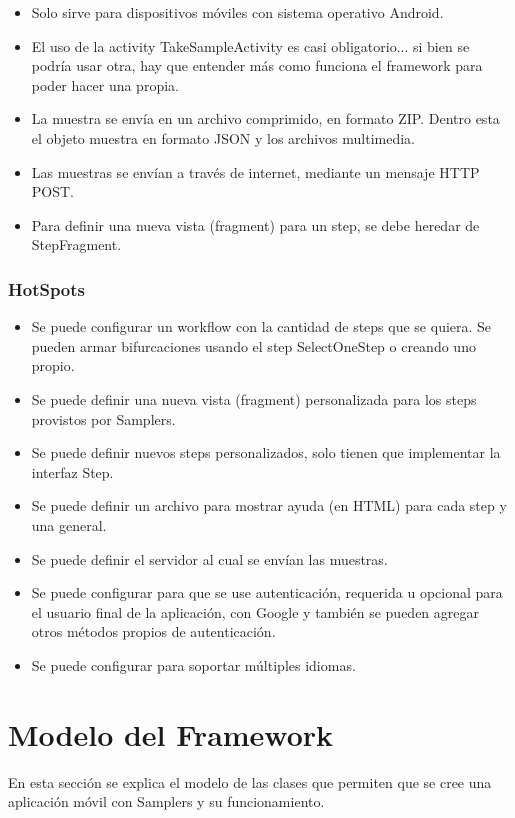 \begin{itemize}
	\item Solo sirve para dispositivos móviles con sistema operativo Android.
	\item El uso de la activity TakeSampleActivity es casi obligatorio... si bien se podría usar otra, hay que entender más como funciona el framework para poder hacer una propia.
	\item La muestra se envía en un archivo comprimido, en formato ZIP. Dentro esta el objeto muestra en formato JSON y los archivos multimedia.
	\item Las muestras se envían a través de internet, mediante un mensaje HTTP POST.
	\item Para definir una nueva vista (fragment) para un step, se debe heredar de StepFragment.
\end{itemize}

\subsubsection{HotSpots}

\begin{itemize}
	\item Se puede configurar un workflow con la cantidad de steps que se quiera. Se pueden armar bifurcaciones usando el step SelectOneStep o creando uno propio.
	\item Se puede definir una nueva vista (fragment) personalizada para los steps provistos por Samplers.
	\item Se puede definir nuevos steps personalizados, solo tienen que implementar la interfaz Step.
	\item Se puede definir un archivo para mostrar ayuda (en HTML) para cada step y una general.
	\item Se puede definir el servidor al cual se envían las muestras.
	\item Se puede configurar para que se use autenticación, requerida u opcional para el usuario final de la aplicación, con Google y también se pueden agregar otros métodos propios de autenticación.
	\item Se puede configurar para soportar múltiples idiomas.
\end{itemize}





\section{Modelo del Framework}
En esta sección se explica el modelo de las clases que permiten que se cree una aplicación móvil con Samplers y su funcionamiento.

